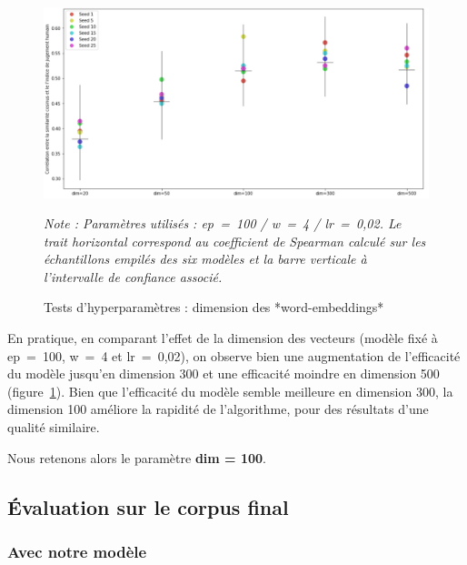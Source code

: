 \documentclass[11pt,french,french]{article}
\begin{document}
\begin{figure}
\begin{center}
\includegraphics[width=1\textwidth]{img/test_parametres2.png}
\captionsetup{margin=0cm,format=hang,justification=justified}
\caption{Tests d'hyperparamètres : dimension des *word-embeddings*}\label{fig:figure_dim}
\end{center}
\vspace{-0.3cm}
\footnotesize
\emph{Note : Paramètres utilisés : ep = 100 / w = 4 / lr = 0,02.\newline
Le trait horizontal correspond au coefficient de Spearman calculé sur les échantillons empilés des six modèles et la barre verticale à l'intervalle de confiance associé.}
\end{figure}

En pratique, en comparant l'effet de la dimension des vecteurs (modèle fixé à ep~=~100, w~=~4 et lr~=~0,02), on observe bien une augmentation de l'efficacité du modèle jusqu'en dimension 300 et une efficacité moindre en dimension 500 (figure~\ref{fig:figure_dim}). Bien que l'efficacité du modèle semble meilleure en dimension 300, la dimension 100 améliore la rapidité de l'algorithme, pour des résultats d'une qualité similaire.

\faArrowCircleRight{} Nous retenons alors le paramètre \textbf{dim = 100}.

\hypertarget{uxe9valuation-sur-le-corpus-final}{%
\subsection{Évaluation sur le corpus final}\label{uxe9valuation-sur-le-corpus-final}}

\hypertarget{avec-notre-moduxe8le}{%
\subsubsection{\texorpdfstring{Avec \og notre \fg{} modèle}{Avec notre  modèle}}\label{avec-notre-moduxe8le}}
\end{document}

